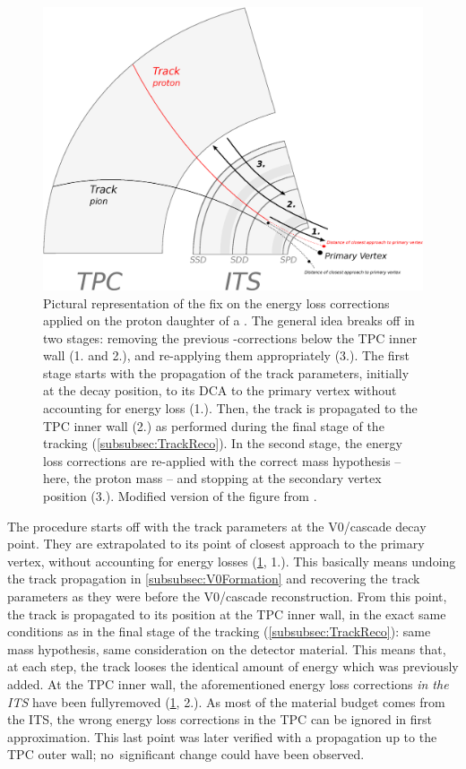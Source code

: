 \begin{figure}[t]
	\centering
	\includegraphics[width=1\textwidth]{Figs/Chapter5/Schema-RetroCorrections.eps}
	\caption{Pictural representation of the fix on the energy loss corrections applied on the proton daughter of a \rmLambdaPM. The general idea breaks off in two stages: removing the previous \dEdx-corrections below the TPC inner wall (1. and 2.), and re-applying them appropriately (3.). The first stage starts with the propagation of the track parameters, initially at the decay position, to its DCA to the primary vertex without accounting for energy loss (1.). Then, the track is propagated to the TPC inner wall (2.) as performed during the final stage of the tracking (\Sec\ref{subsubsec:TrackReco}). In the second stage, the energy loss corrections are re-applied with the correct mass hypothesis -- here, the proton mass -- and stopping at the secondary vertex position (3.). Modified version of the figure from \cite{maireTrackReconstructionPrinciple2011}.}
	\label{fig:SchemeRetroCorrection}
\end{figure}

The procedure starts off with the track parameters at the V0/cascade decay point. They are extrapolated to its point of closest approach to the primary vertex, without accounting for energy losses (\fig\ref{fig:SchemeRetroCorrection}, 1.). This basically means undoing the track propagation in \Sec\ref{subsubsec:V0Formation} and recovering the track parameters as they were before the V0/cascade reconstruction. From this point, the track is propagated to its position at the TPC inner wall, in the exact same conditions as in the final stage of the tracking (\Sec\ref{subsubsec:TrackReco}): same mass hypothesis, same consideration on the detector material. This means that, at each step, the track looses the identical amount of energy which was previously added. At the TPC inner wall, the aforementioned energy loss corrections \textit{in the ITS} have been fully\break removed (\fig\ref{fig:SchemeRetroCorrection}, 2.). As most of the material budget comes from the ITS, the wrong energy loss corrections in the TPC can be ignored in first approximation. This last point was later verified with a propagation up to the TPC outer wall; no~significant change could have been observed.  

